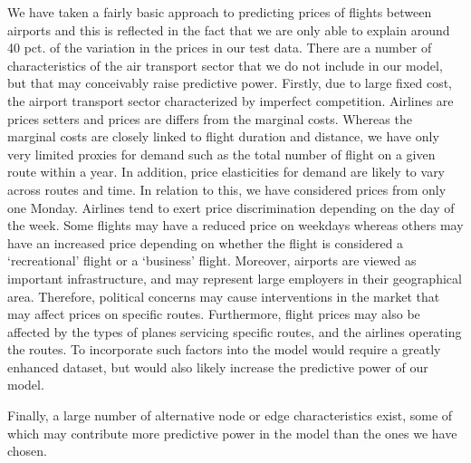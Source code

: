 We have taken a fairly basic approach to predicting prices of flights between airports and this is reflected in the fact that we are only able to explain around 40 pct. of the variation in the prices in our test data. There are a number of characteristics of the air transport sector that we do not include in our model, but that may conceivably raise predictive power. 
Firstly, due to large fixed cost, the airport transport sector characterized by imperfect competition. Airlines are prices setters and prices are differs from the marginal costs. Whereas the marginal costs are closely linked to flight duration and distance, we have only very limited proxies for demand such as the total number of flight on a given route within a year. In addition, price elasticities for demand are likely to vary across routes and time.
In relation to this, we have considered prices from only one Monday. Airlines tend to exert price discrimination depending on the day of the week. Some flights may have a reduced price on weekdays whereas others may have an increased price depending on whether the flight is considered a `recreational' flight or a `business' flight.  
Moreover, airports are viewed as important infrastructure, and may represent large employers in their geographical area. Therefore, political concerns may cause interventions in the market that may affect prices on specific routes. Furthermore, flight prices may also be affected by the types of planes servicing specific routes, and the airlines operating the routes. To incorporate such factors into the model would require a greatly enhanced dataset, but would also likely increase the predictive power of our model.

Finally, a large number of alternative node or edge characteristics exist, some of which may contribute more predictive power in the model than the ones we have chosen. 
